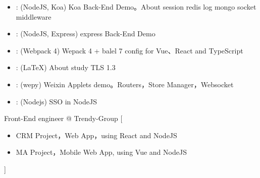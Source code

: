 \documentclass{resume}
\begin{document}
\begin{itemize}
  \item {}:
    (NodeJS, Koa)
    Koa Back-End Demo。About session redis log mongo socket middleware
  \item {}:
    (NodeJS, Express)
    express Back-End Demo
  \item {}:
    (Webpack 4)
    Wepack 4 + balel 7 config for Vue、React and TypeScript
  \item {}:
    (LaTeX)
    About study TLS 1.3
  \item {}:
    (wepy)
    Weixin Applets demo。Routers，Store Manager，Websocket
  \item {}:
    (Nodejs)
    SSO in NodeJS
\end{itemize}

\begin{experiences}
    {Front-End engineer @ Trendy-Group}%
    [\begin{itemize}
      \item  CRM Project，Web App，using React and NodeJS
      \item MA Project，Mobile Web App, using Vue and NodeJS
    \end{itemize}]
\end{experiences}
\end{document}
